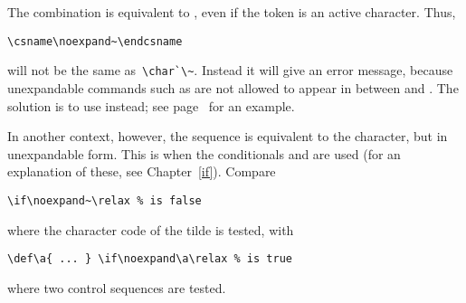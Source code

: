\documentclass{book}
\begin{document}
The combination  
is
equivalent to , even if the token
is an active character. Thus,
\begin{verbatim}
\csname\noexpand~\endcsname
\end{verbatim}
will not be the same as~\verb>\char`\~>.
Instead it will give an error message, because
unexpandable commands \ldash such as  \rdash  are not allowed to appear
in between  and .
The solution is to use  instead; see page~\pageref{store:cat}
for an example.

In another context, however, the sequence
 is equivalent
to the character, but in unexpandable form. This is
when the conditionals  and  are used
(for an explanation of these, see Chapter~\ref{if}).
Compare
\begin{verbatim}
\if\noexpand~\relax % is false
\end{verbatim}
where the character code of the tilde is tested, with
\begin{verbatim}
\def\a{ ... } \if\noexpand\a\relax % is true
\end{verbatim}
where two control sequences are tested.
\end{document}
